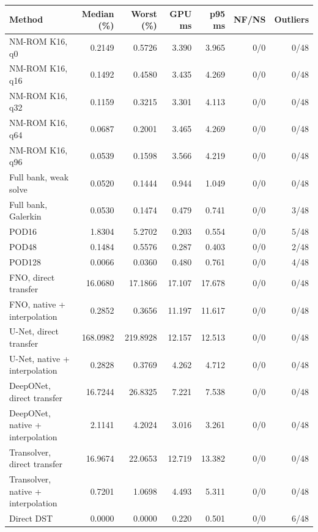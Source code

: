 \begin{table}[htbp]
\centering
\small
\setlength{\tabcolsep}{3pt}
\begin{tabular}{lrrrrrr}
\toprule
Method & Median (\%) & Worst (\%) & GPU ms & p95 ms & NF/NS & Outliers \\
\midrule
NM-ROM K16, q0 & 0.2149 & 0.5726 & 3.390 & 3.965 & 0/0 & 0/48 \\
NM-ROM K16, q16 & 0.1492 & 0.4580 & 3.435 & 4.269 & 0/0 & 0/48 \\
NM-ROM K16, q32 & 0.1159 & 0.3215 & 3.301 & 4.113 & 0/0 & 0/48 \\
NM-ROM K16, q64 & 0.0687 & 0.2001 & 3.465 & 4.269 & 0/0 & 0/48 \\
NM-ROM K16, q96 & 0.0539 & 0.1598 & 3.566 & 4.219 & 0/0 & 0/48 \\
Full bank, weak solve & 0.0520 & 0.1444 & 0.944 & 1.049 & 0/0 & 0/48 \\
Full bank, Galerkin & 0.0530 & 0.1474 & 0.479 & 0.741 & 0/0 & 3/48 \\
POD16 & 1.8304 & 5.2702 & 0.203 & 0.554 & 0/0 & 5/48 \\
POD48 & 0.1484 & 0.5576 & 0.287 & 0.403 & 0/0 & 2/48 \\
POD128 & 0.0066 & 0.0360 & 0.480 & 0.761 & 0/0 & 4/48 \\
FNO, direct transfer & 16.0680 & 17.1866 & 17.107 & 17.678 & 0/0 & 0/48 \\
FNO, native + interpolation & 0.2852 & 0.3656 & 11.197 & 11.617 & 0/0 & 0/48 \\
U-Net, direct transfer & 168.0982 & 219.8928 & 12.157 & 12.513 & 0/0 & 0/48 \\
U-Net, native + interpolation & 0.2828 & 0.3769 & 4.262 & 4.712 & 0/0 & 0/48 \\
DeepONet, direct transfer & 16.7244 & 26.8325 & 7.221 & 7.538 & 0/0 & 0/48 \\
DeepONet, native + interpolation & 2.1141 & 4.2024 & 3.016 & 3.261 & 0/0 & 0/48 \\
Transolver, direct transfer & 16.9674 & 22.0653 & 12.719 & 13.382 & 0/0 & 0/48 \\
Transolver, native + interpolation & 0.7201 & 1.0698 & 4.493 & 5.311 & 0/0 & 0/48 \\
Direct DST & 0.0000 & 0.0000 & 0.220 & 0.501 & 0/0 & 6/48 \\
\bottomrule
\end{tabular}

\end{table}
